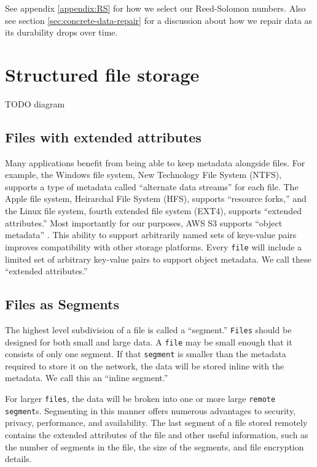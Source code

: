 \documentclass[11pt,fleqn,openany]{book}
\newcommand{\x}[1]{{\tt #1}} \newcommand{\code}[1]{{\em #1}}
\newcommand{\todo}[1]{{\color{red} TODO #1 }}
\begin{document}
See appendix \ref{appendix:RS} for how we select our Reed-Solomon numbers.
Also see section \ref{sec:concrete-data-repair} for a discussion about
how we repair data as its durability drops over time.

\section{Structured file storage}\label{sec:structured-file-storage}

\todo{diagram}

\subsection{Files with extended attributes}

Many applications benefit from being able to keep metadata alongside files. For
example, the Windows file system, New Technology File System (NTFS), supports a type of metadata called
``alternate data streams'' for each file. The Apple file system, Heirarchal File System (HFS), supports
``resource forks,'' and the Linux file system, fourth extended file system (EXT4), supports
``extended attributes.'' Most importantly for
our purposes, AWS S3 supports ``object metadata'' \cite{s3-object-meta}. This ability to support arbitrarily named sets of keys-value pairs improves
compatibility with other storage platforms. Every \x{file} will include a
limited set of arbitrary key-value pairs to support object metadata. We call
these ``extended attributes.''

\subsection{Files as Segments}

The highest level subdivision of a file is called a ``segment.''
\x{Files} should be designed for both small and large data.
A \x{file} may be small enough that it consists of only one segment.
If that \x{segment} is smaller than the metadata required to store it on the
network, the data will be stored inline with the metadata. We call this an
``inline segment.''

For larger \x{files}, the data will be broken
into one or more large \x{remote segment}s. Segmenting in this manner offers
numerous advantages to security, privacy, performance, and availability. The
last segment of a file stored remotely contains the extended attributes of
the file and other useful information, such as the number of segments in the
file, the size of the segments, and file encryption details.
\end{document}
